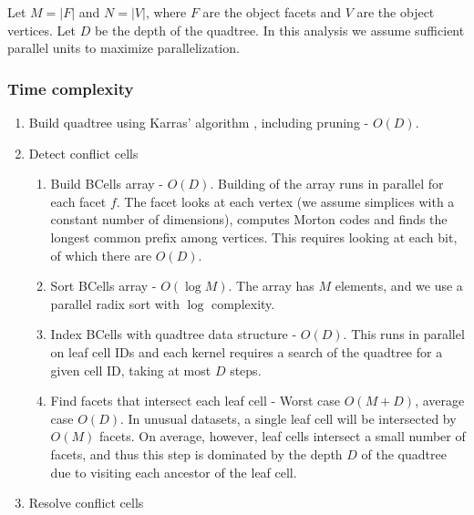 \documentclass[final,3p,times,twocolumn]{elsarticle}
\begin{document}
Let $M = |F|$ and $N = |V|$, where $F$ are the object facets and $V$ are the object vertices. Let $D$ be the depth of the quadtree. In this analysis we assume sufficient parallel units to maximize parallelization.

\subsubsection{Time complexity}

\begin{enumerate}
\item Build quadtree using Karras' algorithm \cite{karras2012maximizing}, including pruning - $O(D)$. 
\item Detect conflict cells
  \begin{enumerate}
  \item Build BCells array - $O(D)$. Building of the array runs in parallel for each facet $f$. The facet looks at each vertex (we assume simplices with a constant number of dimensions), computes Morton codes and finds the longest common prefix among vertices. This requires looking at each bit, of which there are $O(D)$.
  \item Sort BCells array -  $O(\log{M})$. The array has $M$ elements, and we use a parallel radix sort with $\log$ complexity.
  \item Index BCells with quadtree data structure - $O(D)$. This runs in parallel on leaf cell IDs and each kernel requires a search of the quadtree for a given cell ID, taking at most $D$ steps.
  \item Find facets that intersect each leaf cell - Worst case $O(M+D)$, average case $O(D)$. In unusual datasets, a single leaf cell will be intersected by $O(M)$ facets. On average, however, leaf cells intersect a small number of facets, and thus this step is dominated by the depth $D$ of the quadtree due to visiting each ancestor of the leaf cell.
  \end{enumerate}
\item Resolve conflict cells

\end{enumerate}
\end{document}
